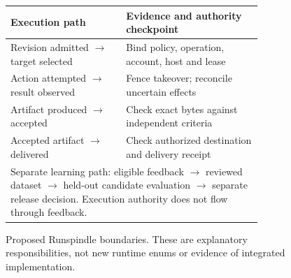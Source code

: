 \begin{figure}[htbp]
\centering\small
\begin{tabular}{|p{0.39\linewidth}|p{0.46\linewidth}|}
\hline
\textbf{Execution path} & \textbf{Evidence and authority checkpoint} \\
\hline
Revision admitted $\rightarrow$ target selected & Bind policy, operation, account, host and lease \\
\hline
Action attempted $\rightarrow$ result observed & Fence takeover; reconcile uncertain effects \\
\hline
Artifact produced $\rightarrow$ accepted & Check exact bytes against independent criteria \\
\hline
Accepted artifact $\rightarrow$ delivered & Check authorized destination and delivery receipt \\
\hline
\multicolumn{2}{|p{0.89\linewidth}|}{Separate learning path: eligible feedback $\rightarrow$ reviewed dataset $\rightarrow$ held-out candidate evaluation $\rightarrow$ separate release decision. Execution authority does not flow through feedback.} \\
\hline
\end{tabular}
\caption{Proposed Runspindle boundaries. These are explanatory responsibilities, not new runtime enums or evidence of integrated implementation.}
\label{fig:workflow-boundaries}
\end{figure}
